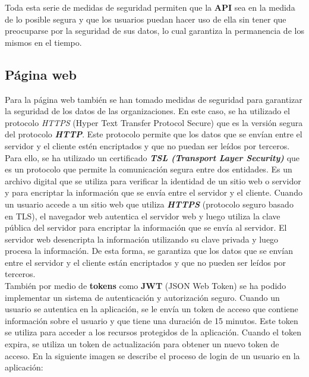 Toda esta serie de medidas de seguridad permiten que la \textbf{API} sea en la medida de lo posible segura y que los usuarios
puedan hacer uso de ella sin tener que preocuparse por la seguridad de sus datos, lo cual garantiza la permanencia
de los mismos en el tiempo.

\subsection{Página web}\label{subsec:pagina-web}

Para la página web también se han tomado medidas de seguridad para garantizar la seguridad de los datos de las organizaciones.
En este caso, se ha utilizado el protocolo \textit{HTTPS} (Hyper Text Transfer Protocol Secure) que es la versión segura
del protocolo \textbf{\textit{HTTP}}. Este protocolo permite que los datos que se envían entre el servidor y el cliente estén encriptados
y que no puedan ser leídos por terceros. Para ello, se ha utilizado un certificado \textbf{\textit{TSL (Transport Layer Security)}} que
es un protocolo que permite la comunicación segura entre dos entidades. Es un archivo digital que se utiliza para verificar
la identidad de un sitio web o servidor y para encriptar la información que se envía entre el servidor y el cliente.
Cuando un usuario accede a un sitio web que utiliza \textbf{\textit{HTTPS}} (protocolo seguro basado en TLS), el navegador web
autentica el servidor web y luego utiliza la clave pública del servidor para encriptar la información que se envía al
servidor. El servidor web desencripta la información utilizando su clave privada y luego procesa la información. De esta
forma, se garantiza que los datos que se envían entre el servidor y el cliente están encriptados y que no pueden ser
leídos por terceros. \\

También por medio de \textbf{tokens} como \textbf{JWT} (JSON Web Token) se ha podido implementar un sistema de autenticación
y autorización seguro. Cuando un usuario se autentica en la aplicación, se le envía un token de acceso que contiene
información sobre el usuario y que tiene una duración de 15 minutos. Este token se utiliza para acceder a los recursos
protegidos de la aplicación. Cuando el token expira, se utiliza un token de actualización para obtener un nuevo token
de acceso. En la siguiente imagen se describe el proceso de login de un usuario en la aplicación:

